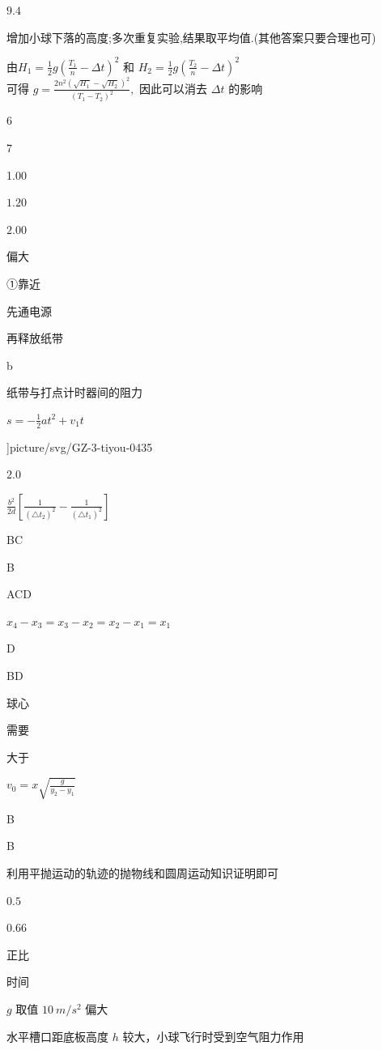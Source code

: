 \item $ 9.4 $
\item 增加小球下落的高度;多次重复实验,结果取平均值.(其他答案只要合理也可)
\item 由$H_{1}=\frac {1}{2} g\left (\frac {T_{1}}{n}-\Delta t\right )^{2}$ 和 $H_{2}=\frac {1}{2} g\left (\frac {T_{2}}{n}-\Delta t\right )^{2}$ \\ 可得 $g=\frac {2 n^{2}(\sqrt {H_{1}}-\sqrt {H_{2}})^{2}}{\left (T_{1}-T_{2}\right )^{2}},$ 因此可以消去 $\Delta t$ 的影响
\item $ 6 $
\item $ 7 $
\item 1.00
\item $ 1.20 $
\item $ 2.00 $
\item 偏大
\item ①靠近
\item 先通电源
\item 再释放纸带
\item b
\item 纸带与打点计时器间的阻力
\item $s=-\frac {1}{2} a t^{2}+v_{1} t$
\item \linewidth ]{picture/svg/GZ-3-tiyou-0435}
\item $ 2.0 $
\item $\frac {b^{2}}{2 d}\left [\frac {1}{\left (\triangle t_{2}\right )^{2}}-\frac {1}{\left (\triangle t_{1}\right )^{2}}\right ]$
\item BC
\item B
\item ACD
\item $x_{4}-x_{3}=x_{3}-x_{2}=x_{2}-x_{1}=x_{1}$
\item D
\item BD
\item 球心
\item 需要
\item 大于
\item $v_{0}=x \sqrt {\frac {g}{y_{2}-y_{1}}}$
\item B
\item B
\item 利用平抛运动的轨迹的抛物线和圆周运动知识证明即可
\item $ 0.5 $
\item $ 0.66 $
\item 正比
\item 时间
\item $ g $ 取值 $ 10 \ m/s^{2} $ 偏大
\item 水平槽口距底板高度 $ h $ 较大，小球飞行时受到空气阻力作用
